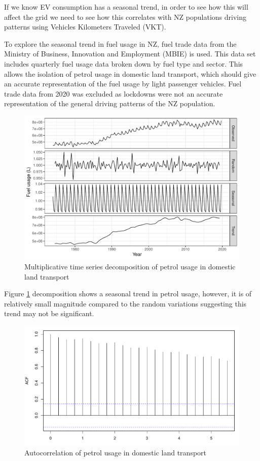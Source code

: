 \documentclass[
]{article}
\begin{document}
If we know EV consumption has a seasonal trend, in order to see how this
will affect the grid we need to see how this correlates with NZ
populations driving patterns using Vehicles Kilometers Traveled (VKT).

To explore the seasonal trend in fuel usage in NZ, fuel trade data
\cite{fuel_trade} from the Ministry of Business, Innovation and
Employment (MBIE) is used. This data set includes quarterly fuel usage
data broken down by fuel type and sector. This allows the isolation of
petrol usage in domestic land transport, which should give an accurate
representation of the fuel usage by light passenger vehicles. Fuel trade
data from 2020 was excluded as lockdowns were not an accurate
representation of the general driving patterns of the NZ population.

\begin{figure}
\centering
\includegraphics{final_report_files/figure-latex/petrol_ts-1.pdf}
\caption{Multiplicative time series decomposition of petrol usage in
domestic land transport\label{fig:petrol_ts}}
\end{figure}

Figure \ref{fig:petrol_ts} decomposition shows a seasonal trend in
petrol usage, however, it is of relatively small magnitude compared to
the random variations suggesting this trend may not be significant.

\begin{figure}
\centering
\includegraphics{final_report_files/figure-latex/acf_petrol-1.pdf}
\caption{Autocorrelation of petrol usage in domestic land
transport\label{fig:acf_petrol}}
\end{figure}
\end{document}
